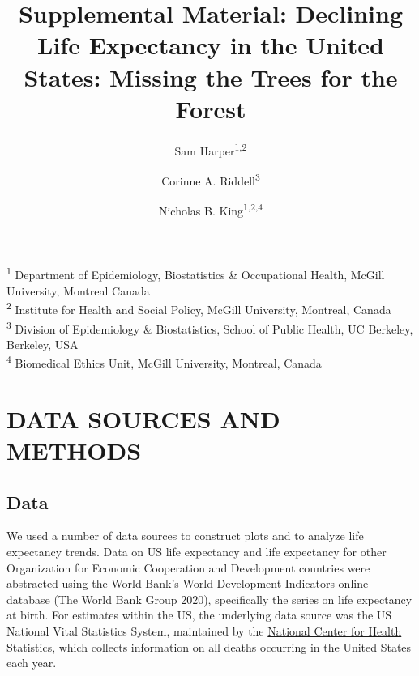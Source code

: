 \documentclass[
  11pt,
]{article}
\title{Supplemental Material: Declining Life Expectancy in the United States:
Missing the Trees for the Forest}
\author{Sam Harper\textsuperscript{1,2} \and Corinne A. Riddell\textsuperscript{3} \and Nicholas B. King\textsuperscript{1,2,4}}
\date{}
\begin{document}
\maketitle

\textsuperscript{1} Department of Epidemiology, Biostatistics \&
Occupational Health, McGill University, Montreal Canada\\
\textsuperscript{2} Institute for Health and Social Policy, McGill
University, Montreal, Canada\\
\textsuperscript{3} Division of Epidemiology \& Biostatistics, School of
Public Health, UC Berkeley, Berkeley, USA\\
\textsuperscript{4} Biomedical Ethics Unit, McGill University, Montreal,
Canada

\hypertarget{data-sources-and-methods}{%
\section{\textbar{} DATA SOURCES AND
METHODS}\label{data-sources-and-methods}}

\hypertarget{data}{%
\subsection{\textbar{} Data}\label{data}}

We used a number of data sources to construct plots and to analyze life
expectancy trends. Data on US life expectancy and life expectancy for
other Organization for Economic Cooperation and Development countries
were abstracted using the World Bank's World Development Indicators
online database (The World Bank Group 2020), specifically the series on
life expectancy at birth. For estimates within the US, the underlying
data source was the US National Vital Statistics System, maintained by
the \href{https://www.cdc.gov/nchs/index.htm}{National Center for Health
Statistics}, which collects information on all deaths occurring in the
United States each year.
\end{document}
